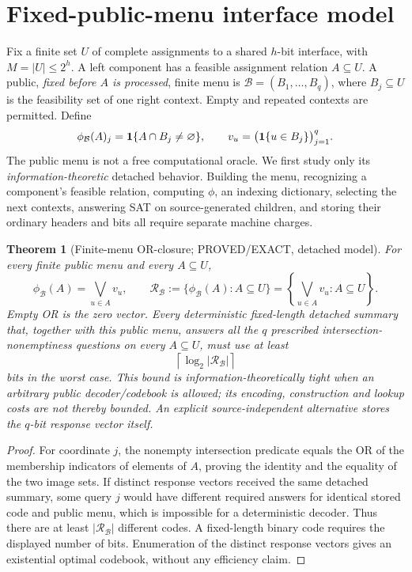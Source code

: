 \documentclass[11pt]{article}
\newtheorem{theorem}{Theorem}
\begin{document}
\section{Fixed-public-menu interface model}
Fix a finite set \(U\) of complete assignments to a shared \(h\)-bit
interface, with \(M=|U|\le 2^h\).
A left component has a feasible assignment relation \(A\subseteq U\).
A public, \emph{fixed before \(A\) is processed}, finite menu is
\(\mathcal B=(B_1,\ldots,B_q)\), where \(B_j\subseteq U\) is the
feasibility set of one right context. Empty and repeated contexts
are permitted. Define
\[
 \phi_{\mathcal B}(A)_j
 ={\bf1}\{A\cap B_j\neq\varnothing\},
 \qquad
 v_u=\bigl({\bf1}\{u\in B_j\}\bigr)_{j=1}^q.
\]
The public menu is not a free computational oracle. We first study
only its \emph{information-theoretic} detached behavior. Building the
menu, recognizing a component's feasible relation, computing
\(\phi\), an indexing dictionary, selecting the next contexts,
answering SAT on source-generated children, and storing their
ordinary headers and bits all require separate machine charges.

\begin{theorem}[Finite-menu OR-closure; PROVED/EXACT, detached model]
For every finite public menu and every \(A\subseteq U\),
\[
 \boxed{\quad
 \phi_{\mathcal B}(A)=\bigvee_{u\in A}v_u,\qquad
 \mathcal R_{\mathcal B}
 :=\{\phi_{\mathcal B}(A):A\subseteq U\}
 =\left\{\bigvee_{u\in A}v_u:A\subseteq U\right\}.
 \quad}
\]
Empty OR is the zero vector. Every deterministic fixed-length detached
summary that, together with this public menu, answers \emph{all}
the \(q\) prescribed intersection-nonemptiness questions
on \emph{every} \(A\subseteq U\), must use at least
\[
 \boxed{\,\left\lceil\log_2|\mathcal R_{\mathcal B}|\right\rceil\,}
\]
bits in the worst case. This bound is information-theoretically tight
when an arbitrary public decoder/codebook is allowed; its encoding,
construction and lookup costs are \emph{not} thereby bounded.
An explicit source-independent alternative stores the \(q\)-bit
response vector itself.
\end{theorem}
\begin{proof}
For coordinate \(j\), the nonempty intersection predicate equals
the OR of the membership indicators of elements of \(A\), proving
the identity and the equality of the two image sets.
If distinct response vectors received the same detached summary,
some query \(j\) would have different required answers for identical
stored code and public menu, which is impossible for a deterministic
decoder. Thus there are at least \(|\mathcal R_{\mathcal B}|\)
different codes. A fixed-length binary code requires the displayed
number of bits. Enumeration of the distinct response vectors gives
an existential optimal codebook, without any efficiency claim.
\end{proof}
\end{document}
